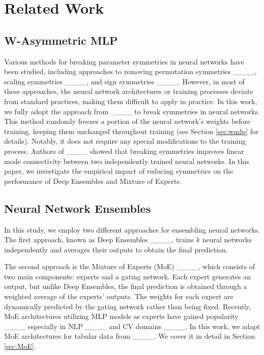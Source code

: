 \section{Related Work}
\subsection{W-Asymmetric MLP}
Various methods for breaking parameter symmetries in neural networks have been studied, including approaches to removing permutation symmetries ____, scaling symmetries ____, and sign symmetries ____. However, in most of these approaches, the neural network architectures or training processes deviate from standard practices, making them difficult to apply in practice. In this work, we fully adopt the approach from ____ to break symmetries in neural networks. This method randomly freezes a portion of the neural network’s weights before training, keeping them unchanged throughout training (see Section \ref{sec:wmlp} for details). Notably, it does not require any special modifications to the training process. Authors of ____ showed that breaking symmetries improves linear mode connectivity between two independently trained neural networks. In this paper, we investigate the empirical impact of reducing symmetries on the performance of Deep Ensembles and Mixture of Experts.

\subsection{Neural Network Ensembles}
In this study, we employ two different approaches for ensembling neural networks. The first approach, known as Deep Ensembles ____, trains $k$ neural networks independently and averages their outputs to obtain the final prediction.

The second approach is the Mixture of Experts (MoE) ____, which consists of two main components: experts and a gating network. Each expert generates an output, but unlike Deep Ensembles, the final prediction is obtained through a weighted average of the experts' outputs. The weights for each expert are dynamically predicted by the gating network rather than being fixed. Recently, MoE architectures utilizing MLP models as experts have gained popularity ____ especially in NLP ____
and CV domains ____. In this work, we adapt MoE architectures for tabular data from ____. We cover it in detail in Section \ref{sec:MoE}.
